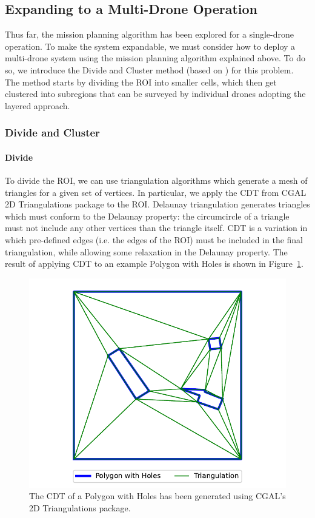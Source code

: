 \subsection{Expanding to a Multi-Drone Operation}
\label{sec:msp_multi_drone}

Thus far, the mission planning algorithm has been explored for a single-drone operation. To make the system expandable, we must consider how to deploy a multi-drone system using the mission planning algorithm explained above. To do so, we introduce the Divide and Cluster method (based on \cite{skorobogatov2021multi}) for this problem. The method starts by dividing the \gls{ROI} into smaller cells, which then get clustered into subregions that can be surveyed by individual drones adopting the layered approach.

\subsubsection{Divide and Cluster}

\paragraph{Divide} To divide the \gls{ROI}, we can use triangulation algorithms which generate a mesh of triangles for a given set of vertices. In particular, we apply the \gls{CDT} from \gls{CGAL} 2D Triangulations package \cite{cgal2024triangulation} to the \gls{ROI}. Delaunay triangulation generates triangles which must conform to the Delaunay property: the circumcircle of a triangle must not include any other vertices than the triangle itself. \gls{CDT} is a variation in which pre-defined edges (i.e. the edges of the \gls{ROI}) must be included in the final triangulation, while allowing some relaxation in the Delaunay property. The result of applying \gls{CDT} to an example Polygon with Holes is shown in Figure~\ref{fig:msp_cdt}. 

\begin{figure}[h]
    \centering
    \includegraphics[width=0.6\linewidth]{figs/Jihwan/cdt.pdf}
    \caption[Constrained Delaunay Triangulation of Polygon with Holes]
    {The \gls{CDT} of a Polygon with Holes has been generated using \gls{CGAL}'s 2D Triangulations package.}
    \label{fig:msp_cdt}
\end{figure}

